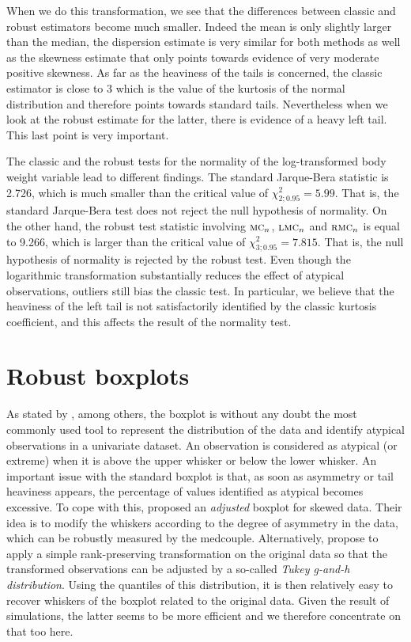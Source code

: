 \begin{stexample}
When we do this transformation, we see that the differences between classic
and robust estimators become much smaller. Indeed the mean is only slightly
larger than the median, the dispersion estimate is very similar for both
methods as well as the skewness estimate that only points towards evidence of
very moderate positive skewness. As far as the heaviness of the tails is
concerned, the classic estimator is close to 3 which is the value of the
kurtosis of the normal distribution and therefore points towards standard tails.
Nevertheless when we look at the robust estimate for the latter, there is
evidence of a heavy left tail. This last point is very important.

The classic and the robust tests for the normality of the log-transformed body
weight variable lead to different findings. The standard Jarque-Bera statistic
is 2.726, which is much smaller than the critical value of $\chi_{2;0.95}^2 =
5.99$. That is, the standard Jarque-Bera test does not reject the null
hypothesis of normality. On the other hand, the robust test statistic involving
$\stsc{MC}_n$, $\stsc{LMC}_n$ and $\stsc{RMC}_n$ is equal to 9.266, which is
larger than the critical value of $\chi_{3;0.95}^2 = 7.815$. That is, the null
hypothesis of normality is rejected by the robust test. Even though the
logarithmic transformation substantially reduces the effect of atypical
observations, outliers still bias the classic test. In particular, we believe
that the heaviness of the left tail is not satisfactorily identified by the
classic kurtosis coefficient, and this affects the result of the normality test.
\end{stexample}



\section{Robust boxplots}

As stated by \citet{Bruffaerts:etal:2014}, among others, the boxplot is without
any doubt the most commonly used tool to represent the distribution of the data
and identify atypical observations in a univariate dataset. An observation is
considered as atypical (or extreme) when it is above the upper whisker or below
the lower whisker. An important issue with the standard boxplot is that, as
soon as asymmetry or tail heaviness appears, the percentage of values
identified as atypical becomes excessive. To cope with this,
\citet{hubert:vandervieren:2008} proposed an \emph{adjusted} boxplot for skewed
data. Their idea is to modify the whiskers according to the degree of asymmetry
in the data, which can be robustly measured by the medcouple. Alternatively,
\citet{Bruffaerts:etal:2014} propose to apply a simple rank-preserving
transformation on the original data so that the transformed observations can be
adjusted by a so-called \emph{Tukey g-and-h distribution}. Using the quantiles
of this distribution, it is then relatively easy to recover whiskers of the
boxplot related to the original data. Given the result of simulations, the
latter seems to be more efficient and we therefore concentrate on that too here.

